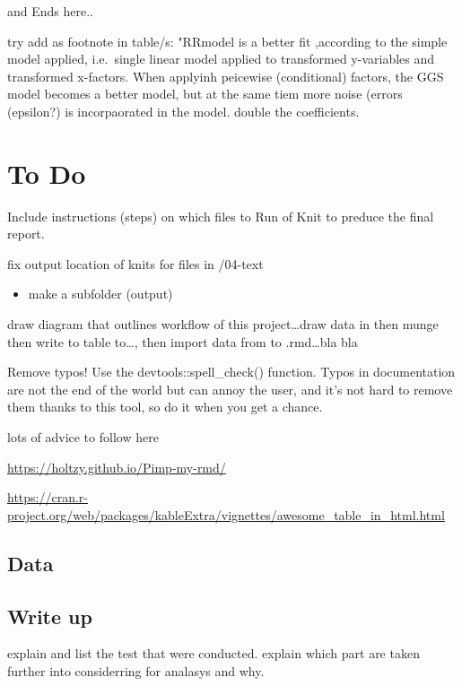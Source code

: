 \documentclass[
]{article}
\providecommand{\tightlist}{%
  \setlength{\itemsep}{0pt}\setlength{\parskip}{0pt}}
\begin{document}
and Ends here..

try add as footnote in table/s: "RRmodel is a better fit ,according to
the simple model applied, i.e.~single linear model applied to
transformed y-variables and transformed x-factors. When applyinh
peicewise (conditional) factors, the GGS model becomes a better model,
but at the same tiem more noise (errors (epsilon?) is incorpaorated in
the model. double the coefficients.

\hypertarget{to-do}{%
\section{To Do}\label{to-do}}

Include instructions (steps) on which files to Run of Knit to preduce
the final report.

fix output location of knits for files in /04-text

\begin{itemize}
\tightlist
\item
  make a subfolder (output)
\end{itemize}

draw diagram that outlines workflow of this project\ldots draw data in
then munge then write to table to\ldots, then import data from to
.rmd\ldots bla bla

Remove typos! Use the devtools::spell\_check() function. Typos in
documentation are not the end of the world but can annoy the user, and
it's not hard to remove them thanks to this tool, so do it when you get
a chance.

lots of advice to follow here

\url{https://holtzy.github.io/Pimp-my-rmd/}

\url{https://cran.r-project.org/web/packages/kableExtra/vignettes/awesome_table_in_html.html}

\hypertarget{data}{%
\subsection{Data}\label{data}}

\hypertarget{write-up}{%
\subsection{Write up}\label{write-up}}

explain and list the test that were conducted. explain which part are
taken further into considerring for analasys and why.
\end{document}
